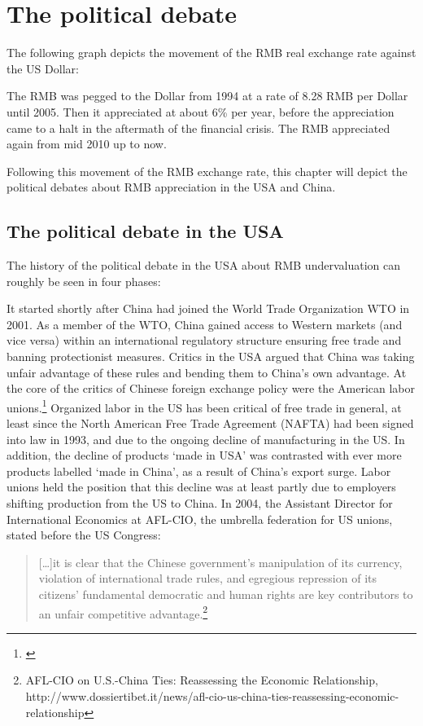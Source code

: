 \section{The political debate}
\label{sec:politics}

The following graph depicts the movement of the RMB real exchange rate against the US Dollar:


The RMB was pegged to the Dollar from 1994 at a rate of 8.28 RMB per 
Dollar until 2005. Then it appreciated at about 6\% per year, before the 
appreciation came to a halt in the aftermath of the financial crisis.  
The RMB appreciated again from mid 2010 up to now.

Following this movement of the RMB exchange rate, this chapter will depict the political debates about RMB appreciation in the USA and China.


\subsection{The political debate in the USA}

The history of the political debate in the USA about RMB undervaluation can roughly be seen in four phases:

It started shortly after China had joined the World Trade Organization WTO in 2001. As a member of the WTO, China gained access to Western markets (and vice versa) within an international regulatory structure ensuring free trade and banning protectionist measures. Critics in the USA argued that China was taking unfair advantage of these rules and bending them to China's own advantage. At the core of the critics of Chinese foreign exchange policy were the American labor unions.\footnote{\cite[pp. 14]{Levy2011}} Organized labor in the US has been critical of free trade in general, at least since the North American Free Trade Agreement (NAFTA) had been signed into law in 1993, and due to the ongoing decline of manufacturing in the US. In addition, the decline of products `made in USA'  was contrasted with ever more products labelled `made in China', as a result of China's export surge. Labor unions held the position that this decline was at least partly due to employers shifting production from the US to China. In 2004, the Assistant Director for International Economics at AFL-CIO, the umbrella federation for US unions, stated before the US Congress: 

\begin{quote}
[\dots]it is clear that the Chinese government’s manipulation of its currency, violation of international trade rules, and egregious repression of its citizens’ fundamental democratic and human rights are key contributors to an unfair competitive advantage.\footnote{AFL-CIO on U.S.-China Ties: Reassessing the Economic Relationship, http://www.dossiertibet.it/news/afl-cio-us-china-ties-reassessing-economic-relationship}
\end{quote}

